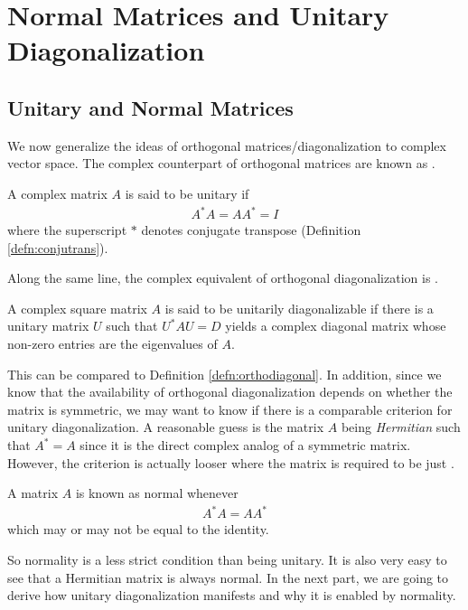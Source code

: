 \section{Normal Matrices and Unitary Diagonalization}

\subsection{Unitary and Normal Matrices} 
We now generalize the ideas of orthogonal matrices/diagonalization to complex vector space. The complex counterpart of orthogonal matrices are known as .
\begin{defn}
A complex matrix $A$ is said to be unitary if
\begin{align*}
A^*A = AA^* = I
\end{align*}
where the superscript $*$ denotes conjugate transpose (Definition \ref{defn:conjutrans}).
\end{defn}
Along the same line, the complex equivalent of orthogonal diagonalization is .
\begin{defn}
\label{defn:unitarydiag}
A complex square matrix $A$ is said to be unitarily diagonalizable if there is a unitary matrix $U$ such that $U^* AU = D$ yields a complex diagonal matrix whose non-zero entries are the eigenvalues of $A$.
\end{defn}
This can be compared to Definition \ref{defn:orthodiagonal}. In addition, since we know that the availability of orthogonal diagonalization depends on whether the matrix is symmetric, we may want to know if there is a comparable criterion for unitary diagonalization. A reasonable guess is the matrix $A$ being \textit{Hermitian} such that $A^* = A$ since it is the direct complex analog of a symmetric matrix. However, the criterion is actually looser where the matrix is required to be just .
\begin{defn}
A matrix $A$ is known as normal whenever
\begin{align*}
A^*A = AA^*    
\end{align*}
which may or may not be equal to the identity.
\end{defn}
So normality is a less strict condition than being unitary. It is also very easy to see that a Hermitian matrix is always normal. In the next part, we are going to derive how unitary diagonalization manifests and why it is enabled by normality.

